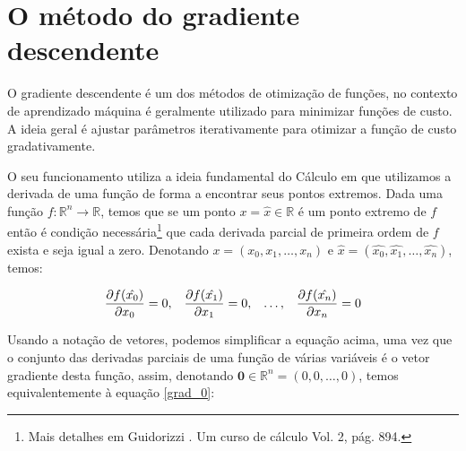 


% 

\chapter{O método do gradiente descendente}
\label{ap:gradiente}

O gradiente descendente é um dos métodos de otimização de funções, no contexto de aprendizado máquina é geralmente utilizado para minimizar funções de custo. A ideia geral é ajustar parâmetros iterativamente para otimizar a função de custo gradativamente. 

O seu funcionamento utiliza a ideia fundamental do Cálculo em que utilizamos a derivada de uma função de forma a encontrar seus pontos extremos. Dada uma função $f{:}\mathbb{R}^n \rightarrow \mathbb{R}$, temos que se um ponto $x = \hat{x} \in \mathbb{R}$ é um ponto extremo de $f$ então é condição necessária\footnote{Mais detalhes em Guidorizzi \citep{guidorizzi2}. Um curso de cálculo Vol. 2, pág. 894.} que cada derivada parcial de primeira ordem de $f$ exista e seja igual a zero. Denotando $x = (x_0, x_1, \ldots, x_n)$ e $\hat{x} = (\hat{x_0}, \hat{x_1}, \ldots, \hat{x_n})$, temos:

\begin{equation}\label{grad_0}
\frac{\partial f(\hat{x_0})}{\partial x_0} = 0 ,\;\;\; \frac{\partial f(\hat{x_1})}{\partial x_1} = 0 ,\;\;\; \ldots ,\;\;\; \frac{\partial f(\hat{x_n})}{\partial x_n} = 0
\end{equation}

Usando a notação de vetores, podemos simplificar a equação acima, uma vez que o conjunto das derivadas parciais de uma função de várias variáveis é o vetor gradiente desta função, assim, denotando $\mathbf{0} \in \mathbb{R}^n = (0, 0, \ldots, 0)$, temos equivalentemente à equação \ref{grad_0}:

